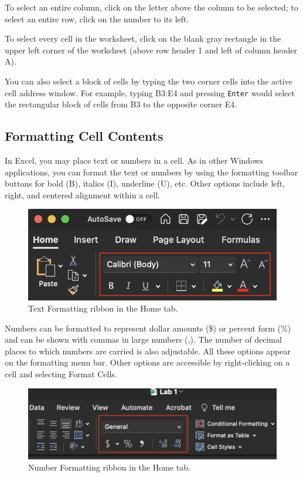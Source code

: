 \documentclass[
]{book}
\begin{document}
To select an entire column, click on the letter above the column to be selected; to select an entire row, click on the number to its left.

To select every cell in the worksheet, click on the blank gray rectangle in the upper left corner of the worksheet (above row header 1 and left of column header A).

You can also select a block of cells by typing the two corner cells into the active cell address window. For example, typing B3:E4 and pressing \texttt{Enter} would select the rectangular block of cells from B3 to the opposite corner E4.

\hypertarget{formatting-cell-contents}{%
\subsection{Formatting Cell Contents}\label{formatting-cell-contents}}

In Excel, you may place text or numbers in a cell. As in other Windows applications, you can format the text or numbers by using the formatting toolbar buttons for bold (B), italics (I), underline (U), etc. Other options include left, right, and centered alignment within a cell.

\begin{figure}

{\centering \includegraphics[width=0.4\linewidth]{text-formatting} 

}

\caption{Text Formatting ribbon in the Home tab.}\label{fig:text-formatting}
\end{figure}

Numbers can be formatted to represent dollar amounts (\$) or percent form (\%) and can be shown with commas in large numbers (,). The number of decimal places to which numbers are carried is also adjustable. All these options appear on the formatting menu bar. Other options are accessible by right-clicking on a cell and selecting Format Cells.

\begin{figure}

{\centering \includegraphics[width=0.4\linewidth]{number-formatting} 

}

\caption{Number Formatting ribbon in the Home tab.}\label{fig:number-formatting}
\end{figure}
\end{document}
